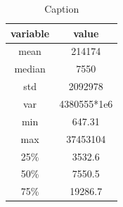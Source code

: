 \documentclass{article}
\newtheorem{theorem}{Theorem}
\begin{document}
\begin{table}
    \centering
    \begin{tabular}{cc}
      variable   &value \\
      \hline
      mean   &214174 \\
      \hline
       median  & 7550\\
       \hline
       std  & 2092978\\
       \hline
        var &4380555*1e6 \\
        \hline
        min & 647.31\\
        \hline
       max  & 37453104\\
       \hline
       25\%  &3532.6 \\
       \hline
        50\% & 7550.5 \\
        \hline
       75\%  &19286.7 \\
    \end{tabular}
    \caption{Caption}
    \label{tab:condition}
\end{table}
\end{document}
